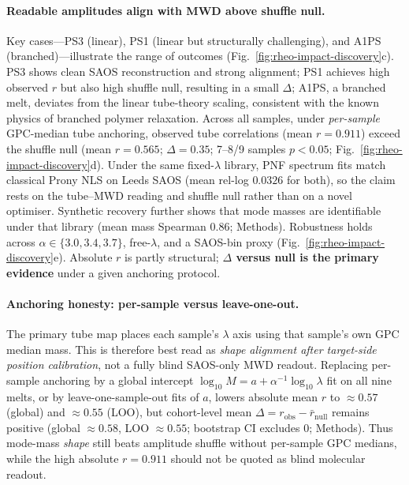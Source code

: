 \documentclass[twocolumn, 10pt]{article}
\begin{document}
\paragraph{Readable amplitudes align with MWD above shuffle null.}
Key cases---PS3 (linear), PS1 (linear but structurally challenging), and A1PS (branched)---illustrate the range of outcomes (Fig.~\ref{fig:rheo-impact-discovery}c). PS3 shows clean SAOS reconstruction and strong alignment; PS1 achieves high observed \(r\) but also high shuffle null, resulting in a small \(\Delta\); A1PS, a branched melt, deviates from the linear tube-theory scaling, consistent with the known physics of branched polymer relaxation. Across all samples, under \emph{per-sample} GPC-median tube anchoring, observed tube correlations (mean \(r=0.911\)) exceed the shuffle null (mean \(r=0.565\); \(\Delta=0.35\); 7--8/9 samples \(p<0.05\); Fig.~\ref{fig:rheo-impact-discovery}d). Under the same fixed-\(\lambda\) library, PNF spectrum fits match classical Prony NLS on Leeds SAOS (mean rel-log \(0.0326\) for both), so the claim rests on the tube--MWD reading and shuffle null rather than on a novel optimiser. Synthetic recovery further shows that mode masses are identifiable under that library (mean mass Spearman \(0.86\); Methods). Robustness holds across \(\alpha\in\{3.0,3.4,3.7\}\), free-\(\lambda\), and a SAOS-bin proxy (Fig.~\ref{fig:rheo-impact-discovery}e). Absolute \(r\) is partly structural; \textbf{\(\Delta\) versus null is the primary evidence} under a given anchoring protocol.

\paragraph{Anchoring honesty: per-sample versus leave-one-out.}
The primary tube map places each sample's \(\lambda\) axis using that sample's own GPC median mass. This is therefore best read as \emph{shape alignment after target-side position calibration}, not a fully blind SAOS-only MWD readout. Replacing per-sample anchoring by a global intercept \(\log_{10}M=a+\alpha^{-1}\log_{10}\lambda\) fit on all nine melts, or by leave-one-sample-out fits of \(a\), lowers absolute mean \(r\) to \(\approx0.57\) (global) and \(\approx0.55\) (LOO), but cohort-level mean \(\Delta=r_{\mathrm{obs}}-\bar r_{\mathrm{null}}\) remains positive (global \(\approx0.58\), LOO \(\approx0.55\); bootstrap CI excludes 0; Methods). Thus mode-mass \emph{shape} still beats amplitude shuffle without per-sample GPC medians, while the high absolute \(r=0.911\) should not be quoted as blind molecular readout.
\end{document}
